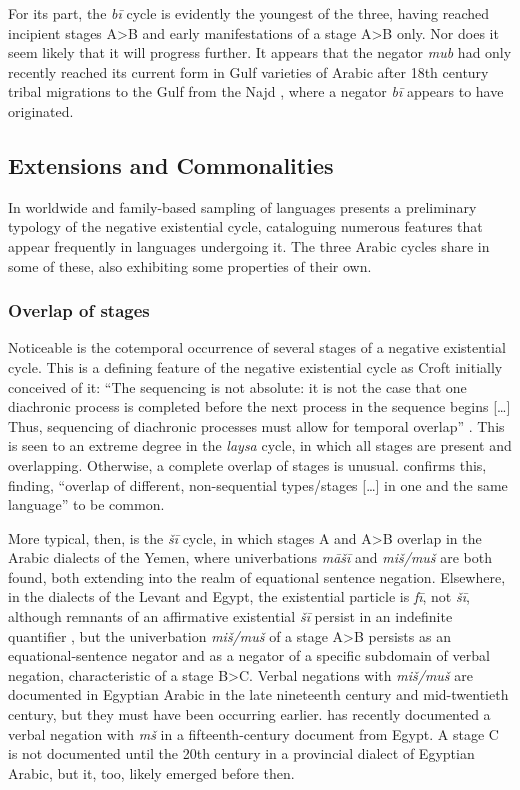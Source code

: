 \documentclass[output=paper]{langsci/langscibook}
\begin{document}
For its part, the \textit{bī} cycle is evidently the youngest of the three, having reached incipient stages A>B and early manifestations of a stage A>B only. Nor does it seem likely that it will progress further. It appears that the negator \textit{mub} had only recently reached its current form in Gulf varieties of Arabic after 18th century tribal migrations to the Gulf from the Najd \citep[28--30]{holes2006a}, where a negator \textit{bī} appears to have originated.

\subsection{Extensions and Commonalities} \label{s:WiAR-5.1}

In worldwide and family-based sampling of languages \citet{Veselinova2016} presents a preliminary typology of the negative existential cycle, cataloguing numerous features that appear frequently in languages undergoing it. The three Arabic cycles share in some of these, also exhibiting some properties of their own. 

\subsubsection{Overlap of stages} \label{s:WiAR-5.1.1}

Noticeable is the cotemporal occurrence of several stages of a negative existential cycle. This is a defining feature of the negative existential cycle as Croft initially conceived of it: “The sequencing is not absolute: it is not the case that one diachronic process is completed before the next process in the sequence begins [\dots] Thus, sequencing of diachronic processes must allow for temporal overlap” \citep[22]{Croft1991}. This is seen to an extreme degree in the \textit{laysa} cycle, in which all stages are present and overlapping. Otherwise, a complete overlap of stages is unusual. \citet[151–154 and passim]{Veselinova2016} confirms this, finding, “overlap of different, non-sequential types/stages [\dots] in one and the same language” \citeyearpar[154, emphasis added]{Veselinova2016} to be common. 

More typical, then, is the \textit{šī} cycle, in which stages A and A>B overlap in the Arabic dialects of the Yemen, where univerbations \textit{māšī} and \textit{miš/muš} are both found, both extending into the realm of equational sentence negation. Elsewhere, in the dialects of the Levant and Egypt, the existential particle is \textit{fī}, not \textit{šī}, although remnants of an affirmative existential \textit{šī} persist in an indefinite quantifier \citep{wilmsen2017a}, but the univerbation \textit{miš/muš} of a stage A>B persists as an equational-sentence negator and as a negator of a specific subdomain of verbal negation, characteristic of a stage B>C. Verbal negations with \textit{miš/muš} are documented in Egyptian Arabic in the late nineteenth century and mid-twentieth century, but they must have been occurring earlier. \citet[158]{wagner2010a} has recently documented a verbal negation with \textit{mš} in a fifteenth-century document from Egypt. A stage C is not documented until the 20th century in a provincial dialect of Egyptian Arabic, but it, too, likely emerged before then.
\end{document}
